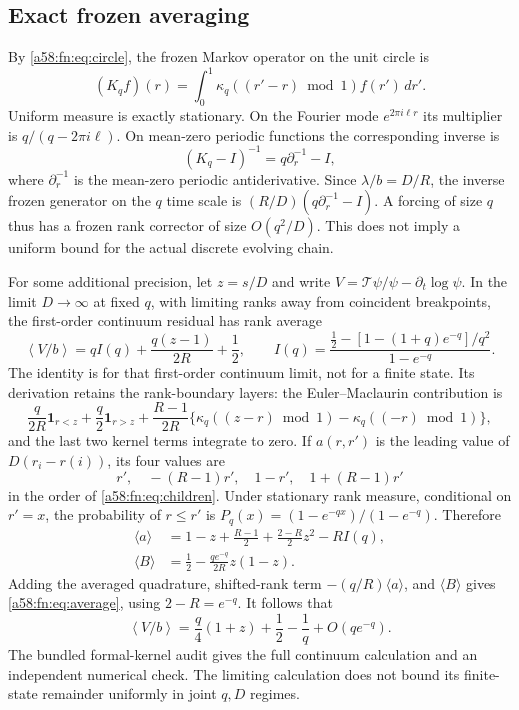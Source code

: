 \documentclass[11pt,letterpaper]{article}
\theoremstyle{remark}
\newcommand{\TT}{\mathcal T}
\newcommand{\one}{\mathbf 1}
\begin{document}
\subsection{Exact frozen averaging}
By \eqref{a58:fn:eq:circle}, the frozen Markov operator on the unit circle is
\[
 (K_qf)(r)=\int_0^1\kappa_q((r'-r)\bmod1)f(r')\,dr'.
\]
Uniform measure is exactly stationary. On the Fourier mode $e^{2\pi i\ell r}$ its multiplier is $q/(q-2\pi i\ell)$. On mean-zero periodic functions the corresponding inverse is
\begin{equation}\label{a58:fn:eq:poisson}
 (K_q-I)^{-1}=q\partial_r^{-1}-I,
\end{equation}
where $\partial_r^{-1}$ is the mean-zero periodic antiderivative. Since $\lambda/b=D/R$, the inverse frozen generator on the $q$ time scale is $(R/D)(q\partial_r^{-1}-I)$. A forcing of size $q$ thus has a frozen rank corrector of size $O(q^2/D)$. This does not imply a uniform bound for the actual discrete evolving chain.

For some additional precision, let $z=s/D$ and write
$V=\TT\psi/\psi-\partial_t\log\psi$. In the limit $D\to\infty$ at fixed $q$, with limiting ranks away from coincident breakpoints, the first-order continuum residual has rank average
\begin{equation}\label{a58:fn:eq:average}
 \left\langle V/b\right\rangle
 =qI(q)+\frac{q(z-1)}{2R}+\frac12,
 \qquad
 I(q)=\frac{\tfrac12-[1-(1+q)e^{-q}]/q^2}{1-e^{-q}}.
\end{equation}
The identity is for that first-order continuum limit, not for a finite state. Its derivation retains the rank-boundary layers: the Euler--Maclaurin contribution is
\[
 \frac q{2R}\one_{r<z}+\frac q2\one_{r>z}
 +\frac{R-1}{2R}\{\kappa_q((z-r)\bmod1)-\kappa_q((-r)\bmod1)\},
\]
and the last two kernel terms integrate to zero. If $a(r,r')$ is the leading value of $D(r_i-r(i))$, its four values are
\[
 r',\quad -(R-1)r',\quad 1-r',\quad 1+(R-1)r'
\]
in the order of \eqref{a58:fn:eq:children}. Under stationary rank measure, conditional on $r'=x$, the probability of $r\le r'$ is
$P_q(x)=(1-e^{-qx})/(1-e^{-q})$. Therefore
\begin{align*}
 \langle a\rangle&=1-z+\frac{R-1}{2}+\frac{2-R}{2}z^2-RI(q),\\
 \langle B\rangle&=\frac12-\frac{qe^{-q}}{2R}z(1-z).
\end{align*}
Adding the averaged quadrature, shifted-rank term $-(q/R)\langle a\rangle$, and $\langle B\rangle$ gives \eqref{a58:fn:eq:average}, using $2-R=e^{-q}$. It follows that
\[
 \left\langle V/b\right\rangle
 =\frac q4(1+z)+\frac12-\frac1q+O(qe^{-q}).
\]
The bundled formal-kernel audit gives the full continuum calculation and an independent numerical check. The limiting calculation does not bound its finite-state remainder uniformly in joint $q,D$ regimes.
\end{document}
